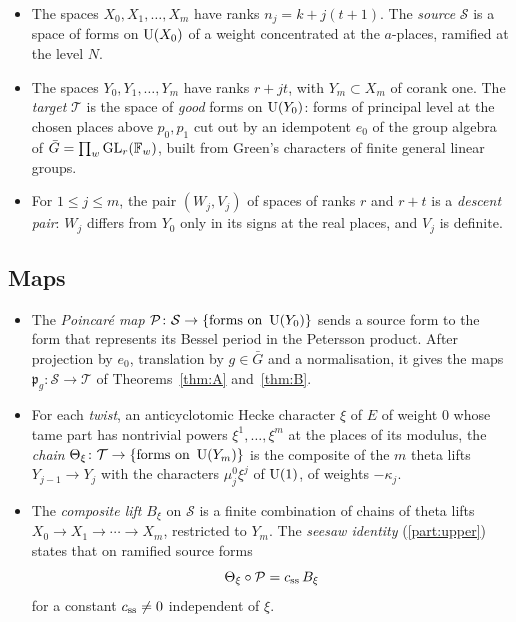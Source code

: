 \begin{itemize}[leftmargin=1.5em]
\item The spaces $X_0,X_1,\dots,X_m$ have ranks $n_j=k+j(t+1)$. The \emph{source} $\mathcal S$ is a
space of forms on $\operatorname{U}(X_0)$ of a weight concentrated at the $a$-places, ramified at the level $N$.
\item The spaces $Y_0,Y_1,\dots,Y_m$ have ranks $r+jt$, with $Y_m\subset X_m$ of corank one. The
\emph{target} $\mathcal T$ is the space of \emph{good} forms on $\operatorname{U}(Y_0)$: forms of principal level at
the chosen places above $p_0,p_1$ cut out by an idempotent $e_0$ of the group algebra of
$\bar G=\prod_w\operatorname{GL}_r(\mathbb{F}_w)$, built from Green's characters of finite general linear groups.
\item For $1\le j\le m$, the pair $(W_j,V_j)$ of spaces of ranks $r$ and $r+t$ is a \emph{descent pair}:
$W_j$ differs from $Y_0$ only in its signs at the real places, and $V_j$ is definite.
\end{itemize}

\subsection{Maps}\label{ss:overview-maps}
\begin{itemize}[leftmargin=1.5em]
\item The \emph{Poincar\'e map} $\mathcal P\colon\mathcal S\to\{\text{forms on }\operatorname{U}(Y_0)\}$ sends a source
form to the form that represents its Bessel period in the Petersson product. After projection by
$e_0$, translation by $g\in\bar G$ and a normalisation, it gives the maps
$\mathfrak p_g\colon\mathcal S\to\mathcal T$ of Theorems~\ref{thm:A} and~\ref{thm:B}.
\item For each \emph{twist}, an anticyclotomic Hecke character $\xi$ of $E$ of weight $0$ whose tame part
has nontrivial powers $\xi^1,\dots,\xi^m$ at the places of its modulus, the \emph{chain}
$\Theta_\xi\colon\mathcal T\to\{\text{forms on }\operatorname{U}(Y_m)\}$ is the composite of the $m$ theta lifts
$Y_{j-1}\to Y_j$ with the characters $\mu_j^0\xi^j$ of $\operatorname{U}(1)$, of weights $-\kappa_j$.
\item The \emph{composite lift} $B_\xi$ on $\mathcal S$ is a finite combination of chains of theta
lifts $X_0\to X_1\to\cdots\to X_m$, restricted to $Y_m$. The \emph{seesaw identity}
(\cref{part:upper}) states that on ramified source forms
\[
  \Theta_\xi\circ\mathcal P=c_{\rm ss}\,B_\xi
\]
for a constant $c_{\rm ss}\neq0$ independent of $\xi$.
\end{itemize}

